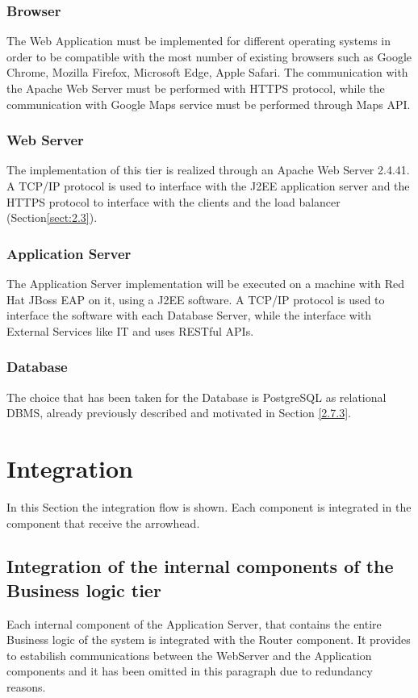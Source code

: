 \documentclass[../DD.tex]{subfiles}
\begin{document}
\subsubsection{Browser}
The Web Application must be implemented for different operating systems in order to be compatible with the most number of existing browsers such as Google Chrome, Mozilla Firefox, Microsoft Edge, Apple Safari. The communication with the Apache Web Server must be performed with HTTPS protocol, while the communication with Google Maps service must be performed through Maps API.

\subsubsection{Web Server}
The implementation of this tier is realized through an Apache Web Server 2.4.41. A TCP/IP protocol is used to interface with the J2EE application server and the HTTPS protocol to interface with the clients and the load balancer (Section\ref{sect:2.3}). 

\subsubsection{Application Server}
The Application Server implementation will be executed on a machine with Red Hat JBoss EAP on it, using a J2EE software. A TCP/IP protocol is used to interface the software with each Database Server, while the interface with External Services like  IT and  uses RESTful APIs.

\subsubsection{Database}
The choice that has been taken for the Database is PostgreSQL as relational DBMS, already previously described and motivated in Section \ref{2.7.3}.

\section{Integration\label{5.3}}

In this Section the integration flow is shown. Each component is integrated in the component that receive the arrowhead.

\subsection{Integration of the internal components of the Business logic tier}
Each internal component of the Application Server, that contains the entire Business logic of the system is integrated with the Router component. It provides to estabilish communications between the WebServer and the Application components and it has been omitted in this paragraph due to redundancy reasons.
\end{document}
